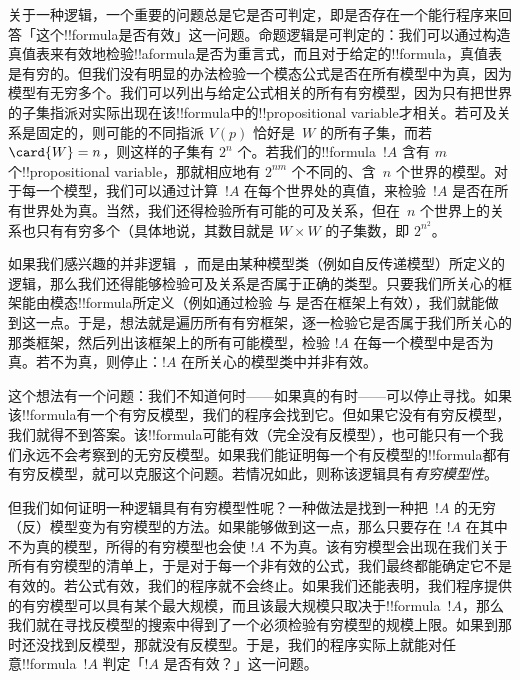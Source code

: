 \documentclass[../../../include/open-logic-section]{subfiles}
\begin{document}


关于一种逻辑，一个重要的问题总是它是否可判定，即是否存在一个能行程序来回答「这个!!{formula}是否有效」这一问题。命题逻辑是可判定的：我们可以通过构造真值表来有效地检验!!a{formula}是否为重言式，而且对于给定的!!{formula}，真值表是有穷的。但我们没有明显的办法检验一个模态公式是否在所有模型中为真，因为模型有无穷多个。我们可以列出与给定公式相关的所有有穷模型，因为只有把世界的子集指派对实际出现在该!!{formula}中的!!{propositional variable}才相关。若可及关系是固定的，则可能的不同指派 $V(p)$ 恰好是~$W$ 的所有子集，而若 $\card{W} = n$，则这样的子集有 $2^n$ 个。若我们的!!{formula}~$!A$ 含有 $m$ 个!!{propositional variable}，那就相应地有 $2^{nm}$ 个不同的、含~$n$ 个世界的模型。对于每一个模型，我们可以通过计算~$!A$ 在每个世界处的真值，来检验~$!A$ 是否在所有世界处为真。当然，我们还得检验所有可能的可及关系，但在~$n$ 个世界上的关系也只有有穷多个（具体地说，其数目就是 $W \times W$ 的子集数，即 $2^{n^2}$。

如果我们感兴趣的并非逻辑~，而是由某种模型类（例如自反传递模型）所定义的逻辑，那么我们还得能够检验可及关系是否属于正确的类型。只要我们所关心的框架能由模态!!{formula}所定义（例如通过检验  与  是否在框架上有效），我们就能做到这一点。于是，想法就是遍历所有有穷框架，逐一检验它是否属于我们所关心的那类框架，然后列出该框架上的所有可能模型，检验 $!A$ 在每一个模型中是否为真。若不为真，则停止：$!A$ 在所关心的模型类中并非有效。

这个想法有一个问题：我们不知道何时——如果真的有时——可以停止寻找。如果该!!{formula}有一个有穷反模型，我们的程序会找到它。但如果它没有有穷反模型，我们就得不到答案。该!!{formula}可能有效（完全没有反模型），也可能只有一个我们永远不会考察到的无穷反模型。如果我们能证明每一个有反模型的!!{formula}都有有穷反模型，就可以克服这个问题。若情况如此，则称该逻辑具有\emph{有穷模型性}。

但我们如何证明一种逻辑具有有穷模型性呢？一种做法是找到一种把~$!A$ 的无穷（反）模型变为有穷模型的方法。如果能够做到这一点，那么只要存在 $!A$ 在其中不为真的模型，所得的有穷模型也会使 $!A$ 不为真。该有穷模型会出现在我们关于所有有穷模型的清单上，于是对于每一个非有效的公式，我们最终都能确定它不是有效的。若公式有效，我们的程序就不会终止。如果我们还能表明，我们程序提供的有穷模型可以具有某个最大规模，而且该最大规模只取决于!!{formula}~$!A$，那么我们就在寻找反模型的搜索中得到了一个必须检验有穷模型的规模上限。如果到那时还没找到反模型，那就没有反模型。于是，我们的程序实际上就能对任意!!{formula}~$!A$ 判定「$!A$ 是否有效？」这一问题。
\end{document}
